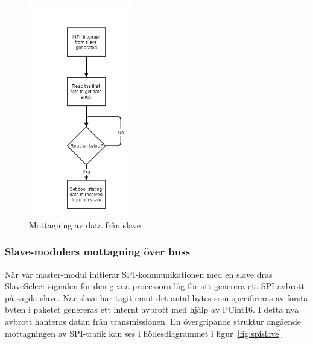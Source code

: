 \documentclass[a4paper,12pt,fleqn]{article}
\begin{document}
\begin{figure}[htp] %
  \begin{center}
  \includegraphics[keepaspectratio=true,width=0.4\textwidth]{bilder/masterinterrupt.jpg}  %
  \end{center}
  \caption{Mottagning av data från slave} %
  \label{fig:spimaster}
\end{figure}


\subsubsection{Slave-modulers mottagning över buss}
När vår master-modul initierar SPI-kommunikationen med en slave dras SlaveSelect-signalen för den givna processorn låg för att generera ett SPI-avbrott på sagda slave. När slave har tagit emot det antal bytes som specificeras av första byten i paketet genereras ett internt avbrott med hjälp av PCint16. I detta nya avbrott hanteras datan från transmissionen. En övergripande struktur angående mottagningen av SPI-trafik kan ses i flödesdiagrammet i figur~\ref{fig:spislave}
\end{document}
